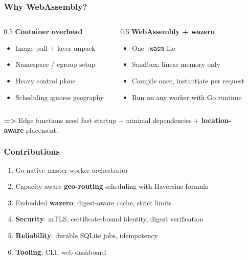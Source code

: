 \documentclass[11pt, aspectratio=169]{beamer}
\begin{document}
\begin{frame}
	\frametitle{Why WebAssembly?}
	\begin{columns}[t]
		\begin{column}{0.5\textwidth}
			\textbf{Container overhead}
			\begin{itemize}
				\item Image pull + layer unpack
				\item Namespace / cgroup setup
				\item Heavy control plane
				\item Scheduling ignores geography
			\end{itemize}
		\end{column}
		\begin{column}{0.5\textwidth}
			\textbf{WebAssembly + wazero}
			\begin{itemize}
				\item One \texttt{.wasm} file
				\item Sandbox: linear memory only
				\item Compile once, instantiate per request 
				\item Run on any worker with Go runtime
			\end{itemize}
		\end{column}
	\end{columns}
	\bigskip
	\textbf{=>} Edge functions need fast startup + minimal dependencies + \textbf{location-aware} placement.
\end{frame}

\begin{frame}
	\frametitle{Contributions}
	\begin{enumerate}
		\item Go-native master-worker orchestrator
		\item Capacity-aware \textbf{geo-routing} scheduling with Haversine formula 
		\item Embedded \textbf{wazero}: digest-aware cache, strict limits
		\item \textbf{Security}: mTLS, certificate-bound identity, digest verification
		\item \textbf{Reliability}: durable SQLite jobs, idempotency
		\item \textbf{Tooling}: CLI, web dashboard
	\end{enumerate}
\end{frame}

\end{document}
